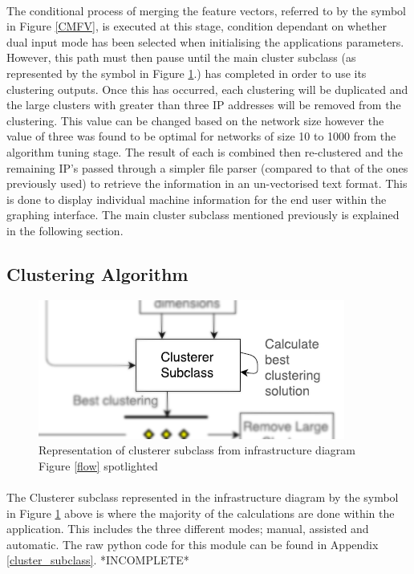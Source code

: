 \paragraph{}The conditional process of merging the feature vectors, referred to by the symbol in Figure \ref{CMFV}, is executed at this stage, condition dependant on whether dual input mode has been selected when initialising the applications parameters. However, this path must then pause until the main cluster subclass (as represented by the symbol in Figure \ref{clustersub}.) has completed in order to use its clustering outputs. Once this has occurred, each clustering will be duplicated and the large clusters with greater than three IP addresses will be removed from the clustering. This value can be changed based on the network size however the value of three was found to be optimal for networks of size 10 to 1000 from the algorithm tuning stage. The result of each is combined then re-clustered and the remaining IP’s passed through a simpler file parser (compared to that of the ones previously used) to retrieve the information in an un-vectorised text format. This is done to display individual machine information for the end user within the graphing interface. The main cluster subclass mentioned previously is explained in the following section.

\subsection{Clustering Algorithm}
\label{infra4}

\begin{figure}[!h]
\centering
\includegraphics{./Figures/clustersubclass.png}
\caption{Representation of clusterer subclass from infrastructure diagram Figure \ref{flow} spotlighted}
\label{clustersub}
\end{figure}

\paragraph{}The Clusterer subclass represented in the infrastructure diagram by the symbol in Figure \ref{clustersub} above is where the majority of the calculations are done within the application. This includes the three different modes; manual, assisted and automatic. The raw python code for this module can be found in Appendix \ref{cluster_subclass}. *INCOMPLETE*

